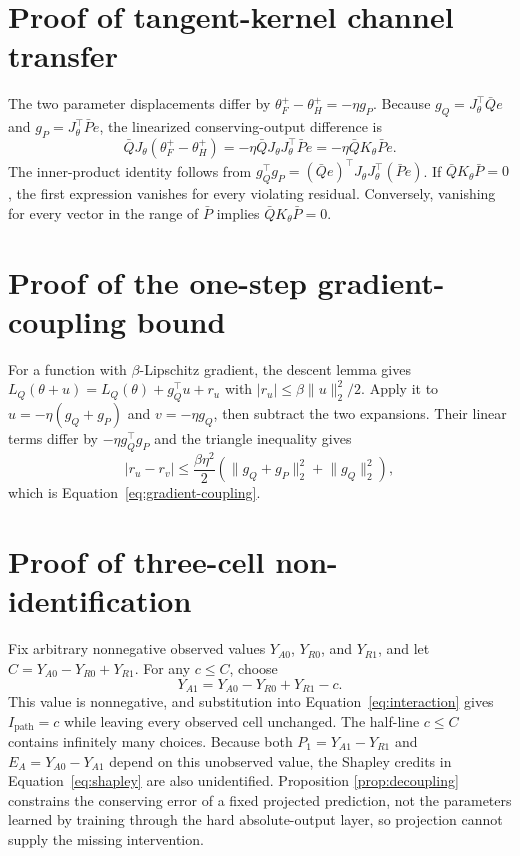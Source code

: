 \documentclass{article}
\newcommand{\Ipath}{I_{\mathrm{path}}}
\begin{document}
\section{Proof of tangent-kernel channel transfer}
\label{app:ntk-transfer}

The two parameter displacements differ by
$\theta_F^+-\theta_H^+=-\eta g_P$. Because
$g_Q=J_\theta^\top\bar Qe$ and $g_P=J_\theta^\top\bar Pe$, the linearized conserving-output
difference is
\begin{equation}
  \bar QJ_\theta(\theta_F^+-\theta_H^+)
  =-\eta\bar QJ_\theta J_\theta^\top\bar Pe
  =-\eta\bar QK_\theta\bar Pe.
\end{equation}
The inner-product identity follows from
$g_Q^\top g_P=(\bar Qe)^\top J_\theta J_\theta^\top(\bar Pe)$.
If $\bar QK_\theta\bar P=0$, the first expression vanishes for every violating residual.
Conversely, vanishing for every vector in the range of $\bar P$ implies
$\bar QK_\theta\bar P=0$.

\section{Proof of the one-step gradient-coupling bound}
\label{app:gradient-coupling}

For a function with $\beta$-Lipschitz gradient, the descent lemma gives
$L_Q(\theta+u)=L_Q(\theta)+g_Q^\top u+r_u$ with
$|r_u|\leq \beta\lVert u\rVert_2^2/2$. Apply it to
$u=-\eta(g_Q+g_P)$ and $v=-\eta g_Q$, then subtract the two expansions. Their linear terms differ
by $-\eta g_Q^\top g_P$ and the triangle inequality gives
\begin{equation}
  |r_u-r_v|\leq \frac{\beta\eta^2}{2}
  \left(\lVert g_Q+g_P\rVert_2^2+\lVert g_Q\rVert_2^2\right),
\end{equation}
which is Equation~\ref{eq:gradient-coupling}.

\section{Proof of three-cell non-identification}
\label{app:missing-cell}

Fix arbitrary nonnegative observed values $Y_{A0}$, $Y_{R0}$, and $Y_{R1}$, and let
$C=Y_{A0}-Y_{R0}+Y_{R1}$. For any $c\leq C$, choose
\begin{equation}
  Y_{A1}=Y_{A0}-Y_{R0}+Y_{R1}-c.
\end{equation}
This value is nonnegative, and substitution into Equation~\ref{eq:interaction} gives
$\Ipath=c$ while leaving every observed cell unchanged. The half-line $c\leq C$ contains
infinitely many choices. Because both $P_1=Y_{A1}-Y_{R1}$ and
$E_A=Y_{A0}-Y_{A1}$ depend on this unobserved value, the Shapley credits in
Equation~\ref{eq:shapley} are also unidentified. Proposition
\ref{prop:decoupling} constrains the conserving error of a fixed projected prediction, not the
parameters learned by training through the hard absolute-output layer, so projection cannot supply
the missing intervention.
\end{document}
